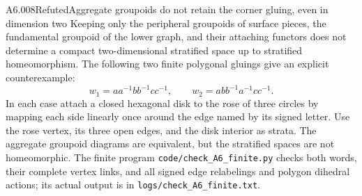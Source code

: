 \begin{saresult}{A6.008}{Refuted}{Aggregate groupoids do not retain the corner gluing, even in dimension two}
Keeping only the peripheral groupoids of surface pieces, the
fundamental groupoid of the lower graph, and their attaching
functors does not determine a compact two-dimensional stratified
space up to stratified homeomorphism. The following two finite
polygonal gluings give an explicit counterexample:
\[
 w_1=aa^{-1}bb^{-1}cc^{-1},\qquad
 w_2=abb^{-1}a^{-1}cc^{-1}.
\]
In each case attach a closed hexagonal disk to the rose of three
circles by mapping each side linearly once around the edge named
by its signed letter. Use the rose vertex, its three open edges,
and the disk interior as strata. The aggregate groupoid diagrams
are equivalent, but the stratified spaces are not homeomorphic.
The finite program \texttt{code/check\_A6\_finite.py} checks both
words, their complete vertex links, and all signed edge relabelings
and polygon dihedral actions; its actual output is in
\texttt{logs/check\_A6\_finite.txt}.
\end{saresult}
